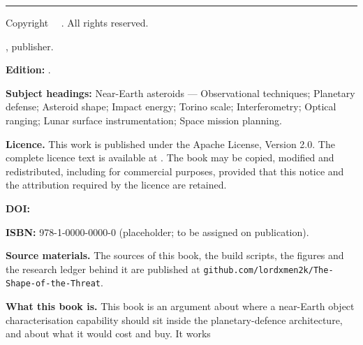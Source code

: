 \clearpage
\thispagestyle{plain}
\noindent{\sffamily\bfseries\color{txt}\bookTitle}\par
\noindent{\sffamily\small\color{txtdim}\bookSubtitle}\par
\vspace{14pt}
\noindent\rule{\textwidth}{0.4pt}\par
\vspace{10pt}
\noindent Copyright \textcopyright\ \bookCopyright\ \bookAuthor. All rights reserved.\par
\vspace{6pt}
\noindent \bookImprint, publisher.\par
\vspace{10pt}
\noindent\textbf{Edition:} \bookEdition.\par
\vspace{6pt}
\noindent\textbf{Subject headings:} Near-Earth asteroids --- Observational
techniques; Planetary defense; Asteroid shape; Impact energy; Torino scale;
Interferometry; Optical ranging; Lunar surface instrumentation; Space mission
planning.\par
\vspace{10pt}
\noindent\textbf{Licence.} This work is published under the Apache License,
Version 2.0. The complete licence text is available at
\href{https://www.apache.org/licenses/LICENSE-2.0}{}.
The book may be copied, modified and redistributed, including for commercial
purposes, provided that this notice and the attribution required by the
licence are retained.\par
\vspace{10pt}
\noindent\textbf{DOI:} \href{https://doi.org/\bookDOI}{\texttt{\bookDOI}}\par
\vspace{10pt}
\noindent\textbf{ISBN:} 978-1-0000-0000-0 (placeholder; to be assigned on
publication).\par
\vspace{10pt}
\noindent\textbf{Source materials.} The sources of this book, the build
scripts, the figures and the research ledger behind it are published at
\texttt{github.com/lordxmen2k/The-Shape-of-the-Threat}.\par
\vspace{10pt}
\noindent\textbf{What this book is.} This book is an argument about where a
near-Earth object characterisation capability should sit inside the
planetary-defence architecture, and about what it would cost and buy. It works
